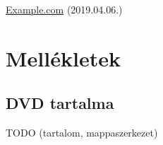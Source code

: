 \documentclass{elteikthesis}
\begin{document}
	\begin{thebibliography}{99}


		\href{http://example.com}{Example.com} (2019.04.06.)

	\end{thebibliography}
	
	\chapter*{Mellékletek}

	
	\section*{DVD tartalma}
	TODO (tartalom, mappaszerkezet)
\end{document}
